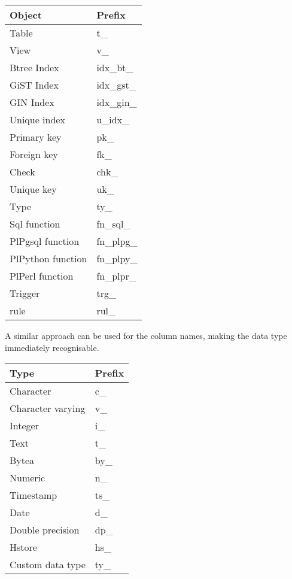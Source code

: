 \begin{table}[H]
    \begin{tabular}{ll}
        \textbf{Object} & \textbf{Prefix}  \\
        \hline
        Table & t\_ \\
        View & v\_ \\
        Btree Index & idx\_bt\_ \\
        GiST Index & idx\_gst\_ \\
        GIN Index & idx\_gin\_ \\
        Unique index & u\_idx\_ \\
        Primary key & pk\_ \\
        Foreign key & fk\_ \\
        Check & chk\_ \\
        Unique key & uk\_ \\
        Type & ty\_ \\
        Sql function & fn\_sql\_ \\
        PlPgsql function & fn\_plpg\_ \\
        PlPython function & fn\_plpy\_ \\
        PlPerl function & fn\_plpr\_ \\
        Trigger & trg\_ \\
        rule & rul\_ \\

    \end{tabular}
\end{table}

A similar approach can be used for the column names, making the data type immediately recognisable.

\begin{table}[H]
    \begin{tabular}{ll}
        \textbf{Type} & \textbf{Prefix}  \\
        \hline
        Character & c\_ \\
        Character varying & v\_ \\
        Integer & i\_ \\
        Text & t\_ \\
        Bytea & by\_ \\
        Numeric & n\_ \\
        Timestamp & ts\_ \\
        Date & d\_ \\
        Double precision & dp\_ \\
        Hstore & hs\_ \\
        Custom data type & ty\_ \\

    \end{tabular}
\end{table}



